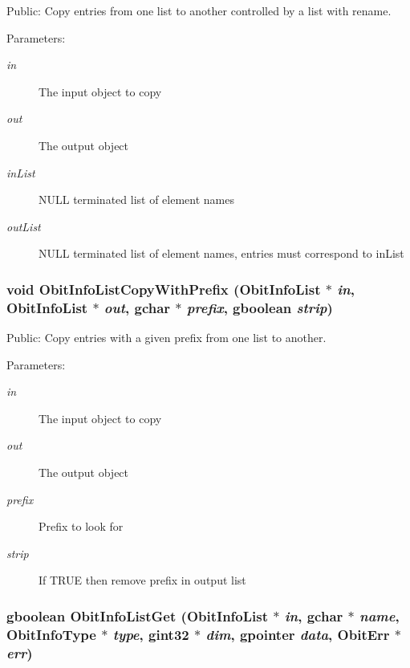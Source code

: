 Public: Copy entries from one list to another controlled by a list with rename. 

\begin{Desc}
\item[Parameters:]
\begin{description}
\item[{\em in}]The input object to copy \item[{\em out}]The output object \item[{\em in\-List}]NULL terminated list of element names \item[{\em out\-List}]NULL terminated list of element names, entries must correspond to in\-List \end{description}
\end{Desc}
\subsubsection{\setlength{\rightskip}{0pt plus 5cm}void Obit\-Info\-List\-Copy\-With\-Prefix ({\bf Obit\-Info\-List} $\ast$ {\em in}, {\bf Obit\-Info\-List} $\ast$ {\em out}, gchar $\ast$ {\em prefix}, gboolean {\em strip})}\label{ObitInfoList_8c_a11}


Public: Copy entries with a given prefix from one list to another. 

\begin{Desc}
\item[Parameters:]
\begin{description}
\item[{\em in}]The input object to copy \item[{\em out}]The output object \item[{\em prefix}]Prefix to look for \item[{\em strip}]If TRUE then remove prefix in output list \end{description}
\end{Desc}
\subsubsection{\setlength{\rightskip}{0pt plus 5cm}gboolean Obit\-Info\-List\-Get ({\bf Obit\-Info\-List} $\ast$ {\em in}, gchar $\ast$ {\em name}, Obit\-Info\-Type $\ast$ {\em type}, gint32 $\ast$ {\em dim}, gpointer {\em data}, {\bf Obit\-Err} $\ast$ {\em err})}\label{ObitInfoList_8c_a15}


